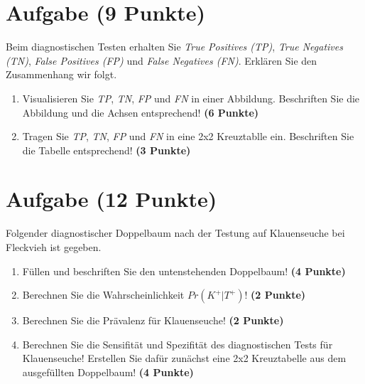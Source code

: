 \documentclass[a4paper, 10pt]{scrartcl}\usepackage[]{graphicx}\usepackage[]{color}
\begin{document}
 
\clearpage

\section{Aufgabe \hfill (9 Punkte)}

Beim diagnostischen Testen erhalten Sie \textit{True Positives (TP)},
\textit{True Negatives (TN)}, \textit{False Positives (FP)} und
\textit{False Negatives (FN)}. Erkl{\"a}ren Sie den Zusammenhang wir folgt.

\begin{enumerate}
\item Visualisieren Sie \textit{TP}, \textit{TN}, \textit{FP} und
  \textit{FN} in einer Abbildung. Beschriften Sie die Abbildung und die
  Achsen entsprechend! \textbf{(6 Punkte)}
\item Tragen Sie \textit{TP}, \textit{TN}, \textit{FP} und \textit{FN} in
  eine 2x2 Kreuztablle ein. Beschriften Sie die Tabelle entsprechend!
  \textbf{(3 Punkte)}
\end{enumerate}





 
\clearpage

\section{Aufgabe \hfill (12 Punkte)}



Folgender diagnostischer Doppelbaum nach der Testung auf Klauenseuche bei
Fleckvieh ist gegeben.

\begin{enumerate}
\item F{\"u}llen und beschriften Sie den untenstehenden Doppelbaum! \textbf{(4
    Punkte)}
\item Berechnen Sie die Wahrscheinlichkeit $Pr(K^+|T^+)$! \textbf{(2 Punkte)}
\item Berechnen Sie die Pr{\"a}valenz f{\"u}r Klauenseuche! \textbf{(2 Punkte)}
\item Berechnen Sie die Sensifit{\"a}t und Spezifit{\"a}t des diagnostischen Tests
  f{\"u}r Klauenseuche! Erstellen Sie daf{\"u}r zun{\"a}chst eine 2x2 Kreuztabelle aus
  dem ausgef{\"u}llten Doppelbaum!
  \textbf{(4 Punkte)}
\end{enumerate}
\end{document}

